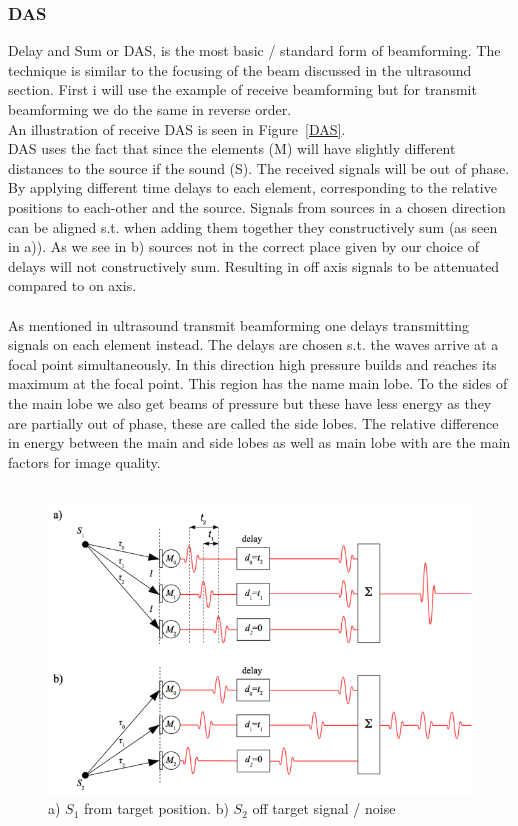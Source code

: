 \documentclass[12pt, a4paper, twoside, UKenglish]{article}
\begin{document}
\subsubsection{DAS}
Delay and Sum or DAS, is the most basic / standard form of beamforming.
The technique is similar to the focusing of the beam discussed in the ultrasound section.
First i will use the example of receive beamforming but for transmit beamforming we do the same in reverse order.\\
An illustration of receive DAS is seen in Figure~\vref{DAS}.\\
DAS uses the fact that since the elements (M) will have slightly different distances to the source if the sound (S). The received signals will be out of phase. By applying different time delays to each element, corresponding to the relative positions to each-other and the source. Signals from sources in a chosen direction can be aligned s.t. when adding them together they constructively sum (as seen in a)). As we see in b) sources not in the correct place given by our choice of delays will not constructively sum. Resulting in off axis signals to be attenuated compared to on axis.\\    
\ \\
As mentioned in ultrasound transmit beamforming one delays transmitting signals on each element instead. The delays are chosen s.t. the waves arrive at a focal point simultaneously.
In this direction high pressure builds and reaches its maximum at the focal point. This region has the name main lobe. To the sides of the main lobe we also get beams of pressure but these have less energy as they are partially out of phase, these are called the side lobes. The relative difference in energy between the main and side lobes as well as main lobe with are the main factors for image quality.\\   
\ \\

\begin{figure}[!htb]
	\includegraphics[scale=0.6]{DAS.png}
	\caption{a) $S_1$ from target position. b) $S_2$ off target signal / noise\label{DAS}}
\end{figure}
\end{document}
